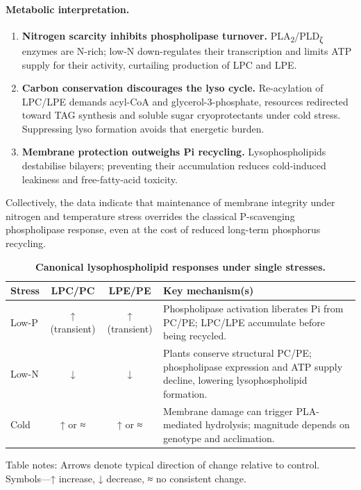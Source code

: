 \documentclass[10pt,letterpaper]{article}
\begin{document}
\paragraph{Metabolic interpretation.}
\begin{enumerate}
  \item \textbf{Nitrogen scarcity inhibits phospholipase turnover.}  
        PLA\textsubscript{2}/PLD\textsubscript{ζ} enzymes are N-rich; low-N
        down-regulates their transcription and limits ATP supply for their activity,
        curtailing production of LPC and LPE.
  \item \textbf{Carbon conservation discourages the lyso cycle.}  
        Re-acylation of LPC/LPE demands acyl-CoA and glycerol-3-phosphate,
        resources redirected toward TAG synthesis and soluble sugar
        cryoprotectants under cold stress.  Suppressing lyso formation avoids that
        energetic burden.
  \item \textbf{Membrane protection outweighs Pi recycling.}  
        Lysophospholipids destabilise bilayers; preventing their accumulation
        reduces cold-induced leakiness and free-fatty-acid toxicity.
\end{enumerate}

Collectively, the data indicate that maintenance of membrane integrity under
nitrogen and temperature stress overrides the classical P-scavenging
phospholipase response, even at the cost of reduced long-term phosphorus
recycling.

\begin{table}[!ht]
  \begin{adjustwidth}{-2.25in}{0in} %
    \centering
    \caption{{\bf Canonical lysophospholipid responses under single stresses.}}
    \begin{tabular}{|l|c|c|p{4.0in}|}
      \hline
      \textbf{Stress} & \textbf{LPC/PC} & \textbf{LPE/PE} & \textbf{Key mechanism(s)} \\ \hline
      Low-P  & ↑ (transient) & ↑ (transient) &
      Phospholipase activation liberates Pi from PC/PE; LPC/LPE accumulate
      before being recycled. \\ \hline
      Low-N  & ↓ & ↓ &
      Plants conserve structural PC/PE; phospholipase expression and ATP supply
      decline, lowering lysophospholipid formation. \\ \hline
      Cold   & ↑ or ≈ & ↑ or ≈ &
      Membrane damage can trigger PLA-mediated hydrolysis; magnitude depends on
      genotype and acclimation. \\ \hline
    \end{tabular}
    \begin{flushleft}
      Table notes: Arrows denote typical direction of change relative to control.
      Symbols—↑ increase, ↓ decrease, ≈ no consistent change.
    \end{flushleft}
    \label{table:lyso_responses}
  \end{adjustwidth}
\end{table}
\end{document}
